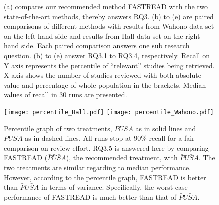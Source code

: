 \documentclass[final,twocolumn,5p]{elsarticle}
\theoremstyle{break}
\begin{document}
\begin{figure}
    \centering
    \quad
    \quad
    \quad
    \quad
    
    
    \caption{(a) compares our recommended method FASTREAD with the two state-of-the-art methods, thereby answers RQ3. (b) to (e) are paired comparisons of different methods with results from Wahono data set on the left hand side and results from Hall data set on the right hand side. Each paired comparison answers one sub research question. (b) to (e) answer RQ3.1 to RQ3.4, respectively. Recall on Y axis represents the percentile of ``relevant'' studies being retrieved. X axis shows the number of studies reviewed with both absolute value and percentage of whole population in the brackets. Median values of recall in $30$ runs are presented. 
    }
    \label{fig:detail}
\end{figure}

\begin{figure}[ht]
    \centering
    \texttt{[image: percentile\_Hall.pdf]}
    \texttt{[image: percentile\_Wahono.pdf]}
    \caption{Percentile graph of two treatments, $\bar{P}\bar{U}\bar{S}A$ as in solid lines and $\bar{P}U\bar{S}A$ as in dashed lines. All runs stop at $90\%$ recall for a fair comparison on review effort. RQ3.5 is answered here by comparing FASTREAD ($\bar{P}\bar{U}\bar{S}A$), the recommended treatment, with $\bar{P}U\bar{S}A$. The two treatments are similar regarding to median performance. However, according to the percentile graph, FASTREAD is better than $\bar{P}U\bar{S}A$ in terms of variance. Specifically, the worst case performance of FASTREAD is much better than that of $\bar{P}U\bar{S}A$.}
    \label{fig:percentile}
\end{figure}
\end{document}
